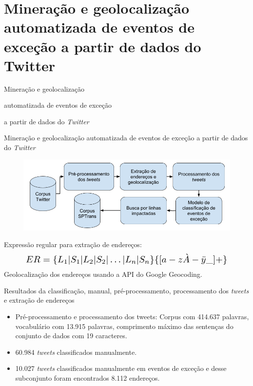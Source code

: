 \documentclass{beamer}
\begin{document}
\section{Mineração e geolocalização automatizada de eventos de exceção a partir de dados do Twitter}
\begin{frame}
\Huge{\centerline{Mineração e geolocalização}}
\Huge{\centerline{automatizada de eventos de exceção}}
\Huge{\centerline{a partir de dados do \textit{Twitter}}}
\end{frame}
\begin{frame}{Mineração e geolocalização automatizada de eventos de exceção a partir de dados do \textit{Twitter}}
    \begin{figure}[!htb]%
	\centering
		\includegraphics[width=1\linewidth]{tweet_based_methodology_pt.png}
	\label{fig:pizza_bus}
\end{figure}
Expressão regular para extração de endereços:
\begin{equation}
\resizebox{.9 \textwidth}{!} 
{
$ER = \lbrace L_1 | S_1 | L_2 | S_2 | \dots | L_n | S_n \rbrace \lbrace [a-z\grave{A}-\ddot{y}\_] + \rbrace$
}
\end{equation}
Geolocalização dos endereços usando a API do Google Geocoding.
\end{frame}
\begin{frame}{Resultados da classificação, manual, pré-processamento, processamento dos \textit{tweets} e extração de endereços}
\begin{itemize}
    \item Pré-processamento e processamento dos tweets: Corpus com \alert{414.637 palavras}, vocabulário com \alert{13.915 palavras}, comprimento máximo das sentenças do conjunto de dados com \alert{19 caracteres}.
    \item \alert{60.984} \textit{tweets} classificados manualmente.
    \item \alert{10.027} \textit{tweets} classificados manualmente em eventos de exceção e desse subconjunto foram encontrados \alert{8.112 endereços}. 
\end{itemize}
\end{frame}
\end{document}
